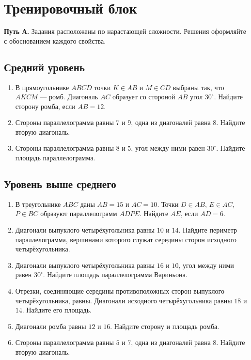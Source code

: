 \documentclass[a4paper,12pt]{article}
\begin{document}
\clearpage
\thispagestyle{empty}



\clearpage

\section*{\color{darkaccent}Тренировочный блок}

\textbf{Путь А.} Задания расположены по нарастающей сложности. Решения оформляйте с обоснованием каждого свойства.

\subsection*{\color{darkaccent}Средний уровень}

\begin{enumerate}
    \item В прямоугольнике $ABCD$ точки $K\in AB$ и $M\in CD$ выбраны так, что $AKCM$ --- ромб. Диагональ $AC$ образует со стороной $AB$ угол $30^\circ$. Найдите сторону ромба, если $AB=12$.

    \item Стороны параллелограмма равны $7$ и $9$, одна из диагоналей равна $8$. Найдите вторую диагональ.

    \item Стороны параллелограмма равны $8$ и $5$, угол между ними равен $30^\circ$. Найдите площадь параллелограмма.
\end{enumerate}

\subsection*{\color{darkaccent}Уровень выше среднего}

\begin{enumerate}[resume]
    \item В треугольнике $ABC$ даны $AB=15$ и $AC=10$. Точки $D\in AB$, $E\in AC$, $P\in BC$ образуют параллелограмм $ADPE$. Найдите $AE$, если $AD=6$.

    \item Диагонали выпуклого четырёхугольника равны $10$ и $14$. Найдите периметр параллелограмма, вершинами которого служат середины сторон исходного четырёхугольника.

    \item Диагонали выпуклого четырёхугольника равны $16$ и $10$, угол между ними равен $30^\circ$. Найдите площадь параллелограмма Вариньона.

    \item Отрезки, соединяющие середины противоположных сторон выпуклого четырёхугольника, равны. Диагонали исходного четырёхугольника равны $18$ и $14$. Найдите его площадь.

    \item Диагонали ромба равны $12$ и $16$. Найдите сторону и площадь ромба.

    \item Стороны параллелограмма равны $5$ и $7$, одна из диагоналей равна $8$. Найдите вторую диагональ.
\end{enumerate}
\end{document}
